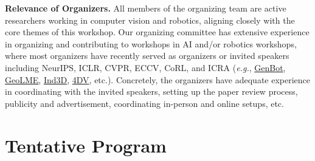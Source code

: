 \documentclass[runningheads]{llncs}
\begin{document}
\vspace{-0.5em}
\noindent
\textbf{Relevance of Organizers.}
All members of the organizing team are active researchers working in computer vision and robotics, aligning closely with the core themes of this workshop. Our organizing committee has extensive experience in organizing and contributing to workshops in AI and/or robotics workshops, where most organizers have recently served as organizers or invited speakers including NeurIPS, ICLR, CVPR, ECCV, CoRL, and ICRA (\textit{e.g.}, \href{https://genbot-workshop.github.io/}{\color{emailblue}GenBot}, \href{https://geo-lme.github.io/}{\color{emailblue}GeoLME}, \href{https://ind3dworkshop.github.io/cvpr2025/}{\color{emailblue}Ind3D}, \href{https://4dvisionworkshop.github.io/}{\color{emailblue}4DV}, etc.). Concretely, the organizers have adequate experience in coordinating with the invited speakers, setting up the paper review process, publicity and advertisement, coordinating in-person and online setups, etc.

\vspace{-1.25em}
\section{Tentative Program}

\vspace{-1.25em}
\end{document}
